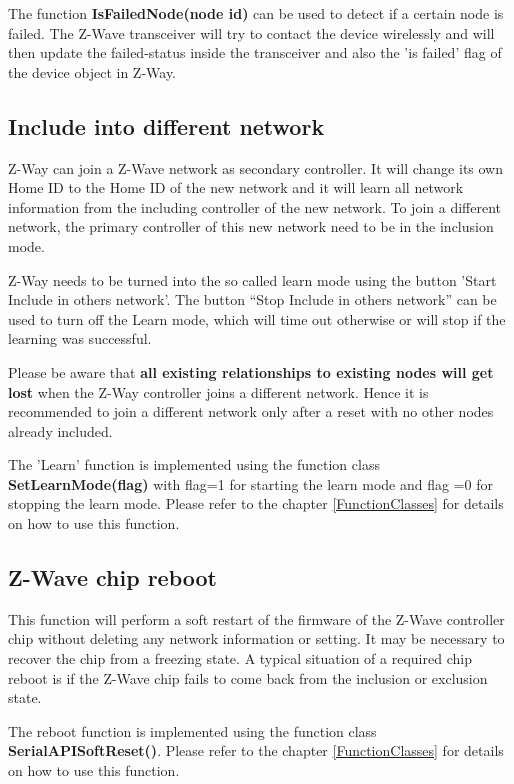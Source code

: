 The function {\bf IsFailedNode(node id)} can be used to detect if a certain node is 
failed. The Z-Wave transceiver will try to contact the device wirelessly and will then 
update the failed-status inside the transceiver and also the 'is failed' flag of the 
device object in Z-Way.

\subsection{Include into different network}

Z-Way can join a Z-Wave network as secondary controller. It will change its own Home ID to the Home ID of the new network and it will learn all network information 
from the including controller of the new network. To join a different network, the primary controller of this new network need to be in the inclusion mode.

Z-Way needs to be turned into the so called learn mode using the button 'Start Include in 
others network'. The button “Stop Include in others network” can be used to turn off 
the Learn mode, which will time out otherwise or will stop if the learning was successful.

Please be aware that \textbf{all existing relationships to existing nodes will get lost} 
when the Z-Way controller joins a different network. Hence it is recommended to join a 
different network only after a reset with no other nodes already included. 

The 'Learn' function is implemented using the function class {\bf SetLearnMode(flag)} 
with flag=1 for starting the learn mode and flag =0 for stopping the learn mode. Please 
refer to the chapter \ref{FunctionClasses} for details on how to use this function.


\subsection{Z-Wave chip reboot}

This function will perform a soft restart of the firmware of the Z-Wave controller chip 
without deleting any network information or setting. It may be necessary to recover the 
chip from a freezing state. A typical situation of a required chip reboot is if the 
Z-Wave chip fails to come back from the inclusion or exclusion state.

The reboot function is implemented using the function class {\bf SerialAPISoftReset()}.  
Please refer to the chapter \ref{FunctionClasses} for details on how to use this function.


